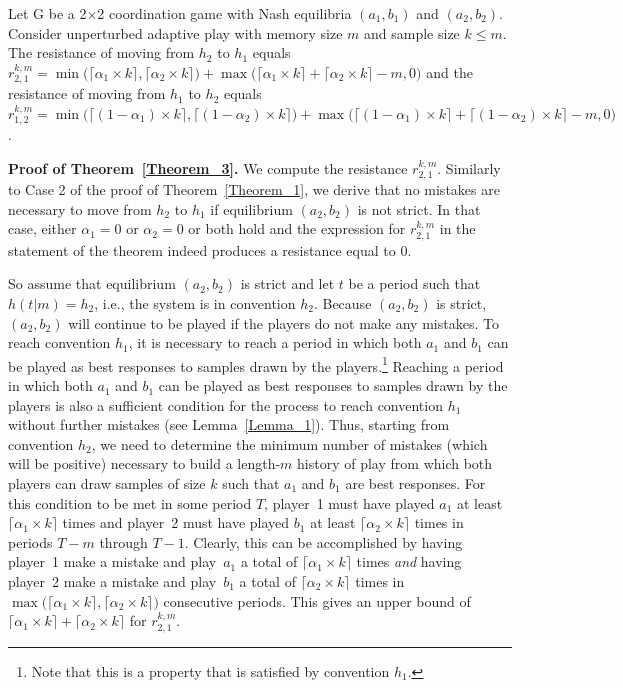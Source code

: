 \begin{theorem}\label{Theorem_3}
Let G be a 2$\times$2 coordination game with Nash equilibria $(a_1,b_1)$ and $(a_2,b_2)$. 
Consider unperturbed adaptive play with memory size $m$ and sample size $k\leq m$. 
The resistance of moving from $h_2$ to $h_1$ equals $r_{2,1}^{k,m} = \min\big(\lceil \alpha_1 \times k \rceil,\lceil \alpha_2 \times k \rceil\big)+\max\big(\lceil\alpha_1\times k\rceil+\lceil \alpha_2 \times k \rceil-m,0\big)$ and the resistance of moving from $h_1$ to $h_2$ equals $r^{k,m}_{1,2}=\min\big(\lceil (1-\alpha_1) \times k \rceil, \lceil (1-\alpha_2) \times  k \rceil\big)+\max\big(\lceil (1-\alpha_1) \times k \rceil+\lceil (1-\alpha_2) \times k \rceil-m,0\big)$. 
\end{theorem}


\textbf{Proof of Theorem~\ref{Theorem_3}.} 
We compute the resistance $r_{2,1}^{k,m}$. Similarly to Case 2 of the proof of Theorem~\ref{Theorem_1}, we derive that no mistakes are necessary to move from $h_2$ to $h_1$ if equilibrium $(a_2,b_2)$ is not strict. In that case, either $\alpha_1=0$ or $\alpha_2=0$ or both hold and the expression for $r_{2,1}^{k,m}$ in the statement of the theorem indeed produces a resistance equal to 0.  

So assume that equilibrium $(a_2,b_2)$ is strict and let $t$ be a period such that $h(t|m) = h_2$, i.e., the system is in convention $h_2$. 
Because $(a_2,b_2)$ is strict, $(a_2,b_2)$ will continue to be played if the players do not make any mistakes. To reach convention $h_1$, it is necessary to reach a period in which both $a_1$ and $b_1$ can be played as best responses to samples drawn by the players.\footnote{Note that this is a property that is satisfied by convention $h_1$.} 
Reaching a period in which both $a_1$ and $b_1$ can be played as best responses to samples drawn by the players is also a sufficient condition for the process to reach convention $h_1$ without further mistakes (see Lemma~\ref{Lemma_1}). 
%
Thus, starting from convention $h_2$, we need to determine the minimum number of mistakes (which will be positive) necessary to build a length-$m$ history of play from which both players can draw samples of size $k$ such that $a_1$ and $b_1$ are best responses. 
For this condition to be met in some period $T$, player~1 must have played $a_1$ at least $\lceil \alpha_1 \times k \rceil$ times and player~2 must have played $b_1$ at least $\lceil \alpha_2 \times k \rceil$ times in periods $T-m$ through $T-1$. 
%
Clearly, this can be accomplished by having player~1 make a mistake and play~$a_1$ a total of $\lceil \alpha_1 \times k \rceil$ times \emph{and} having player~2 make a mistake and play~$b_1$ a total of $\lceil \alpha_2 \times k \rceil$ times in $\max\big(\lceil \alpha_1 \times k \rceil,\lceil \alpha_2 \times k \rceil\big)$ consecutive periods. 
This gives an upper bound of $\lceil \alpha_1 \times k \rceil + \lceil \alpha_2 \times k \rceil$ for $r_{2,1}^{k,m}$.
%

